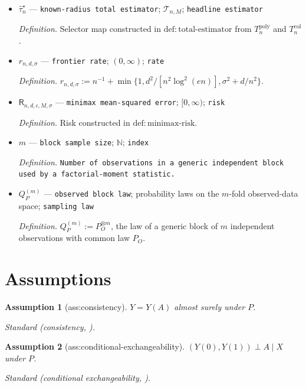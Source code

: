 \documentclass{article}
\newtheorem{assumption}{Assumption}
\begin{document}
\begin{itemize}
  \item \(\widehat\tau_n^{\star}\) --- \texttt{known-\allowbreak{}radius total estimator}; \(\mathcal T_{n,M}\); \texttt{headline estimator}
  \par\smallskip\noindent\emph{Definition.} Selector map constructed in \(\mathrm{def:total\text{-}estimator}\) from \(T_n^{\mathrm{poly}}\) and \(T_n^{\mathrm{col}}\).
  \item \(r_{n,d,\sigma}\) --- \texttt{frontier rate}; \((0,\infty)\); \texttt{rate}
  \par\smallskip\noindent\emph{Definition.} \(r_{n,d,\sigma}:=n^{-1}+\min\{1,d^2/[n^2\log^2(en)],\sigma^2+d/n^2\}\).
  \item \(\mathsf R_{n,d,\epsilon,M,\sigma}\) --- \texttt{minimax mean-\allowbreak{}squared error}; \([0,\infty)\); \texttt{risk}
  \par\smallskip\noindent\emph{Definition.} Risk constructed in \(\mathrm{def:minimax\text{-}risk}\).
  \item \(m\) --- \texttt{block sample size}; \(\mathbb N\); \texttt{index}
  \par\smallskip\noindent\emph{Definition.} \texttt{Number of observations in a generic independent block used by a factorial-\allowbreak{}moment statistic.}
  \item \(Q_P^{(m)}\) --- \texttt{observed block law}; probability laws on the \(m\)-fold observed-data space; \texttt{sampling law}
  \par\smallskip\noindent\emph{Definition.} \(Q_P^{(m)}:=P_O^{\otimes m}\), the law of a generic block of \(m\) independent observations with common law \(P_O\).
\end{itemize}

\section{Assumptions}

\begin{assumption}[ass:consistency]\label{ass:consistency}
\(Y=Y(A)\) almost surely under \(P\).
\par\smallskip\noindent\emph{Standard} (consistency, \cite{ZengBalakrishnanHanKennedy2024}).
\end{assumption}

\begin{assumption}[ass:conditional-exchangeability]\label{ass:conditional-exchangeability}
\((Y(0),Y(1))\perp A\mid X\) under \(P\).
\par\smallskip\noindent\emph{Standard} (conditional exchangeability, \cite{ZengBalakrishnanHanKennedy2024}).
\end{assumption}
\end{document}
